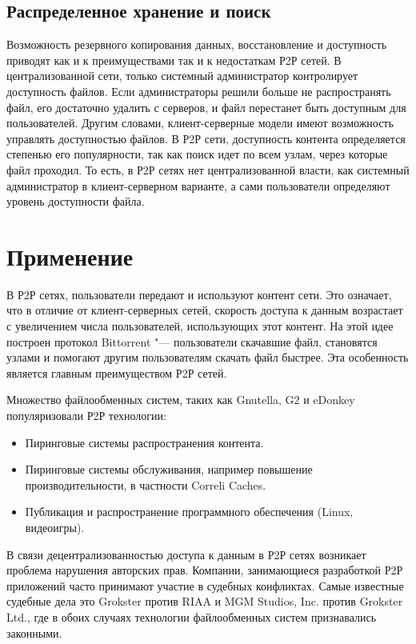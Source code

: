 \documentclass[bachelor, och, coursework]{SCWorks}
\begin{document}
\subsection{Распределенное хранение и поиск}
Возможность резервного копирования данных, восстановление и доступность приводят как и к преимуществами так и к недостаткам Р2Р сетей. В централизованной сети, только системный администратор контролирует доступность файлов. Если администраторы решили больше не распространять файл, его достаточно удалить с серверов, и файл перестанет быть доступным для пользователей. Другим словами, клиент-серверные модели имеют возможность управлять доступностью файлов. В Р2Р сети, доступность контента определяется степенью его популярности, так как поиск идет по всем узлам, через которые файл проходил. То есть, в Р2Р сетях нет централизованной власти, как системный администратор в клиент-серверном варианте, а сами пользователи определяют уровень доступности файла.

\section{Применение}
В Р2Р сетях, пользователи передают и используют контент сети. Это означает, что в отличие от клиент-серверных сетей, скорость доступа к данным возрастает с увеличением числа пользователей, использующих этот контент. На этой идее построен протокол Bittorrent "--- пользователи скачавшие файл, становятся узлами и помогают другим пользователям скачать файл быстрее. Эта особенность является главным преимуществом Р2Р сетей.

Множество файлообменных систем, таких как Gnutella, G2 и eDonkey популяризовали Р2Р технологии:
\begin{itemize}
    \item Пиринговые системы распространения контента.
    \item Пиринговые системы обслуживания, например повышение производительности, в частности Correli Caches.
    \item Публикация и распространение программного обеспечения (Linux, видеоигры).
\end{itemize}

В связи децентрализованностью доступа к данным в Р2Р сетях возникает проблема нарушения авторских прав. Компании, занимающиеся разработкой Р2Р приложений часто принимают участие в судебных конфликтах. Самые известные судебные дела это Grokster против RIAA и MGM Studios, Inc. против Grokster Ltd., где в обоих случаях технологии файлообменных систем признавались законными.
\end{document}
